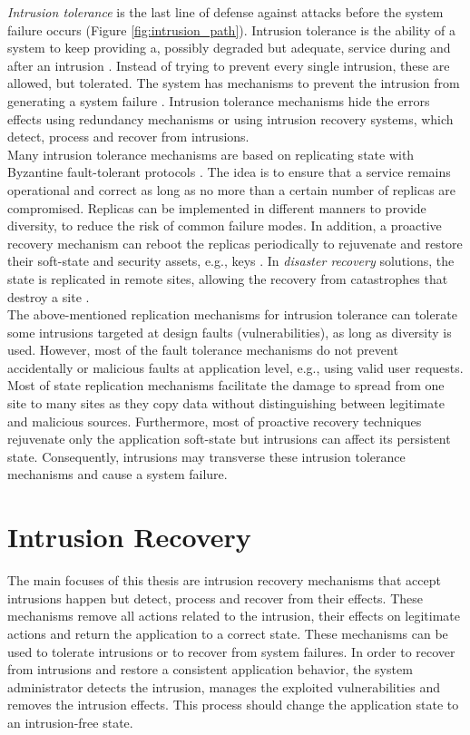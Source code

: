 \emph{Intrusion tolerance} is the last line of defense against attacks before the system failure occurs (Figure \ref{fig:intrusion_path}). Intrusion tolerance is the ability of a system to keep providing a, possibly degraded but adequate, service during and after an intrusion \cite{Stavridou2001a}. Instead of trying to prevent every single intrusion, these are allowed, but tolerated. The system has mechanisms to prevent the intrusion from generating a system failure \cite{Verissimo2003}. Intrusion tolerance mechanisms hide the errors effects using redundancy mechanisms or using intrusion recovery systems, which detect, process and recover from intrusions.\\

Many intrusion tolerance mechanisms are based on replicating state with Byzantine fault-tolerant protocols \cite{Schneider1990,Castro2002,Veronese2011}. The idea is to ensure that a service remains operational and correct as long as no more than a certain number of replicas are compromised. Replicas can be implemented in different manners to provide diversity, to reduce the risk of common failure modes. In addition, a proactive recovery mechanism can reboot the replicas periodically to rejuvenate and restore their soft-state and security assets, e.g., keys \cite{Candea2001,Castro2002,Sousa2010}. In \emph{disaster recovery} solutions, the state is replicated in remote sites, allowing the recovery from catastrophes that destroy a site \cite{cloud-disaster}.\\

The above-mentioned replication mechanisms for intrusion tolerance can tolerate some intrusions targeted at design faults (vulnerabilities), as long as diversity is used. However, most of the fault tolerance mechanisms do not prevent accidentally or malicious faults at application level, e.g., using valid user requests. Most of state replication mechanisms facilitate the damage to spread from one site to many sites as they copy data without distinguishing between legitimate and malicious sources. Furthermore, most of proactive recovery techniques rejuvenate only the application soft-state but intrusions can affect its persistent state. Consequently, intrusions may transverse these intrusion tolerance mechanisms and cause a system failure. 


\section{Intrusion Recovery}
\label{sec:related:recovery}
The main focuses of this thesis are intrusion recovery mechanisms that accept intrusions happen but detect, process and recover from their effects. These mechanisms remove all actions related to the intrusion, their effects on legitimate actions and return the application to a correct state. These mechanisms can be used to tolerate intrusions or to recover from system failures. In order to recover from intrusions and restore a consistent application behavior, the system administrator detects the intrusion, manages the exploited vulnerabilities and removes the intrusion effects. This process should change the application state to an intrusion-free state.\\

